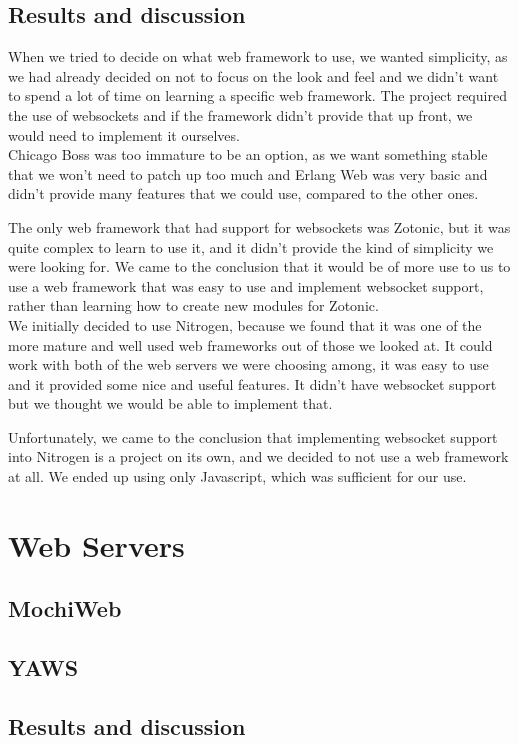 \documentclass[11pt,a4paper]{report}
\begin{document}
\subsection{Results and discussion}
When we tried to decide on what web framework to use, we wanted simplicity, as
we had already decided on not to focus on the look and feel and we didn't want
to spend a lot of time on learning a specific web framework.
The project required the use of websockets and if the framework didn't
provide that up front, we would need to implement it ourselves.\\

Chicago Boss was too immature to be an option, as we want something stable that
we won't need to patch up too much and Erlang Web was very basic and didn't
provide many features that we could use, compared to the other ones.

The only web framework that had support for websockets was Zotonic, but it was
quite complex to learn to use it, and it didn't provide the kind of simplicity
we were looking for. We came to the conclusion that it would be of more use to
us to use a web framework that was easy to use and implement websocket support,
rather than learning how to create new modules for Zotonic.\\

We initially decided to use Nitrogen, because we found that it was one of the
more mature and well used web frameworks out of those we looked at. It could
work with both of the web servers we were choosing among, it was easy to use and
it provided some nice and useful features. It didn't have websocket support but
we thought we would be able to implement that.

Unfortunately, we came to the conclusion that implementing websocket support
into Nitrogen is a project on its own, and we decided to not use a web
framework at all. We ended up using only Javascript, which was sufficient for
our use.

\section{Web Servers}
\subsection{MochiWeb}
\subsection{YAWS}
\subsection{Results and discussion}
\end{document}
